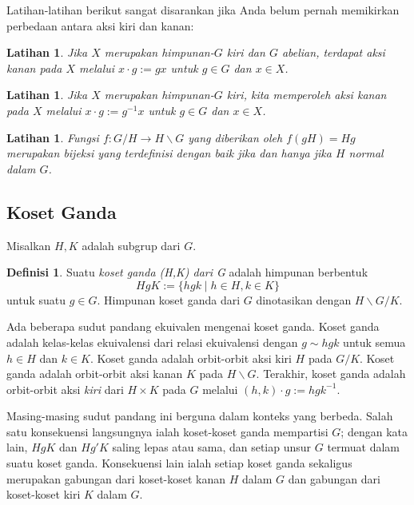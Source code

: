\documentclass[12pt]{article}
\theoremstyle{plain}
\newtheorem{exercise}[theorem]{Latihan}
\theoremstyle{definition}
\newtheorem{definition}[theorem]{Definisi}
\theoremstyle{remark}
\numberwithin{equation}{section}
\begin{document}
Latihan-latihan berikut sangat disarankan jika Anda belum pernah
memikirkan perbedaan antara aksi kiri dan kanan:

\begin{exercise}
Jika $X$ merupakan himpunan-$G$ \emph{kiri} dan $G$ abelian, terdapat
aksi \emph{kanan} pada $X$ melalui $x \cdot g := gx$ untuk $g \in G$ dan $x \in X$.
\end{exercise}

\begin{exercise}
Jika $X$ merupakan himpunan-$G$ \emph{kiri}, kita memperoleh aksi \emph{kanan}
pada $X$ melalui $x \cdot g := g^{-1}x$ untuk $g \in G$ dan $x \in X$.
\end{exercise}

\begin{exercise}
Fungsi $f : G/H \to H\backslash G$ yang diberikan oleh $f(gH)=Hg$ merupakan
bijeksi yang terdefinisi dengan baik jika dan hanya jika $H$ normal dalam $G$.
\end{exercise}

\subsection{Koset Ganda}

Misalkan $H, K$ adalah subgrup dari $G$.

\begin{definition}
Suatu \emph{koset ganda (H,K) dari G} adalah himpunan berbentuk
\[
HgK := \{ hgk \mid h \in H, k \in K \}
\]
untuk suatu $g \in G$.
Himpunan koset ganda dari $G$ dinotasikan dengan
$H \backslash G / K$.
\end{definition}

Ada beberapa sudut pandang ekuivalen mengenai koset ganda.
Koset ganda adalah kelas-kelas ekuivalensi dari relasi ekuivalensi
dengan $g \sim hgk$ untuk semua $h \in H$ dan $k \in K$.
Koset ganda adalah orbit-orbit aksi kiri $H$ pada $G/K$.
Koset ganda adalah orbit-orbit aksi kanan $K$ pada $H\backslash G$.
Terakhir, koset ganda adalah orbit-orbit aksi \emph{kiri}
dari $H \times K$ pada $G$ melalui $(h,k)\cdot g := hgk^{-1}$.

Masing-masing sudut pandang ini berguna dalam konteks yang berbeda.
Salah satu konsekuensi langsungnya ialah koset-koset ganda mempartisi $G$;
dengan kata lain, $HgK$ dan $Hg'K$ saling lepas atau sama,
dan setiap unsur $G$ termuat dalam suatu koset ganda.
Konsekuensi lain ialah setiap koset ganda sekaligus merupakan gabungan dari
koset-koset kanan $H$ dalam $G$ dan gabungan dari koset-koset kiri $K$ dalam $G$.
\end{document}
